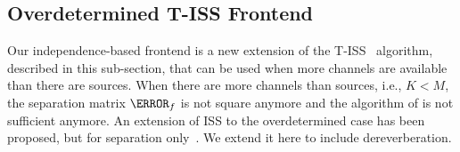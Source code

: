 \documentclass[a4paper]{article}
\begin{document}
\subsection{Overdetermined T-ISS Frontend}

Our independence-based frontend is a new extension of the T-ISS~\cite{nakashimaJointDereverberationSeparation2021} algorithm, described in this sub-section, that can be used when more channels are available than there are sources.
When there are more channels than sources, i.e., $K < M$, the separation matrix $\mW_f$ is not square anymore and the algorithm of  is not sufficient anymore.
An extension of ISS to the overdetermined case has been proposed, but for separation only~\cite{duComputationallyEfficientOverdeterminedBlind2021}.
We extend it here to include dereverberation.
\end{document}
